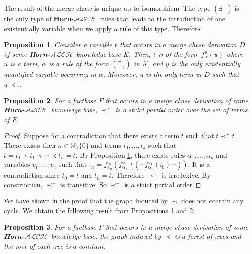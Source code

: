 \documentclass{article}
\newtheorem{proposition}{Proposition}[section]
\theoremstyle{definition}
\newtheorem{definition}{Definition}[section]
\theoremstyle{remark}
\def \N {\mathbb N}
\newcommand{\ALCH}{\textbf{Horn-$\mathcal{ALCH}$}}
\begin{document}
The result of the merge chase is unique up to isomorphism. The type $(\exists_+)$ is the only type of \ALCH\ rules that leads to the introduction of one existentially variable when we apply a rule of this type. Therefore:

\begin{proposition} \label{prec}
Consider a variable $t$ that occurs in a merge chase derivation $D$ of some \ALCH\ knowledge base $K$.
Then, $t$ is of the form $f^y_\alpha(u)$ where $u$ is a term, $\alpha$ is a rule of the form $(\exists_+)$ in $K$, and $y$ is the only existentially quantified variable occurring in $\alpha$.
Moreover, $u$ is the only term in $D$ such that $u \prec t$.
\end{proposition}




\begin{proposition} \label{partial_order}
For a factbase $F$ that occurs in a merge chase derivation of some \ALCH\ knowledge base, $\prec^+$ is a strict partial order over the set of terms of $F$.
\end{proposition}

\begin{proof}
Suppose for a contradiction that there exists a term $t$ such that $t \prec^+ t$. There exists then $n \in \N \setminus \{0\}$ and terms $t_0,\ldots,t_n$ such that $t=t_0 \prec t_1 \prec \cdots \prec t_n = t$. By Proposition \ref{prec}, there exists rules $\alpha_1,\ldots, \alpha_n$ and variables $v_1,\ldots,v_n$ such that $t_n = f_{\alpha_n}^{v_n}(f_{\alpha_{n-1}}^{v_{n-1}}(\cdots f_{\alpha_1}^{v_1}(t_0)\cdots))$. It is a contradiction since $t_0 = t$ and $t_n=t$. Therefore $\prec^+$ is irreflexive. By construction, $\prec^+$ is transitive; So $\prec^+$ is a strict partial order
\end{proof}

We have shown in the proof that the graph induced by $\prec$ does not contain any cycle. We obtain the following result from Propositions \ref{prec} and \ref{partial_order}:

\begin{proposition}
For a factbase $F$ that occurs in a merge chase derivation of some \ALCH\ knowledge base, the graph induced by $\prec$ is a forest of trees and the root of each tree is a constant.
\end{proposition}




%
\end{document}
